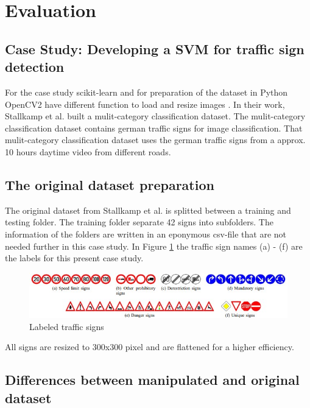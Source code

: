 \section{Evaluation}
\label{sec:evaluation}

\subsection{Case Study: Developing a SVM for traffic sign detection}

For the case study scikit-learn \cite{scikit-learn} and for preparation of the dataset in Python OpenCV2 have different function to load and resize images \cite{opencv_library}. In their work, Stallkamp et al. \cite{DBLP:conf/ijcnn/StallkampSSI11} built a mulit-category classification dataset. The mulit-category classification dataset contains german traffic signs for image classification. That mulit-category classification dataset uses the german traffic signs from a approx. 10 hours daytime video from different roads.

\subsection{The original dataset preparation}

The original dataset from Stallkamp et al. is splitted between a training and testing folder. The training folder separate 42 signs into subfolders. The information of the folders are written in an eponymous csv-file that are not needed further in this case study. In Figure \ref{fig:traffic_signs} the traffic sign names (a) - (f) are the labels for this present case study.

\begin{figure}[h!]
  \centering
  \includegraphics[width=12cm]{pictures/traffic_signs.jpg}
  \caption{Labeled traffic signs \cite{DBLP:conf/ijcnn/StallkampSSI11}}
  \label{fig:traffic_signs}
\end{figure}

All signs are resized to 300x300 pixel and are flattened for a higher efficiency.

\subsection{Differences between manipulated and original dataset}
